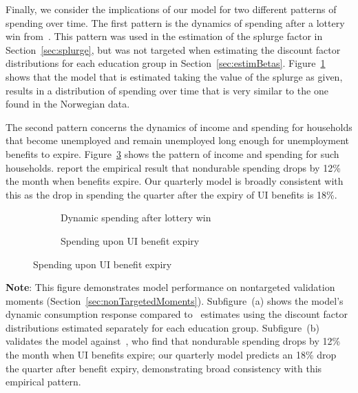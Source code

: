 \documentclass[qe,draft]{econsocart}
\theoremstyle{plain}
\theoremstyle{definition}
\begin{document}
Finally, we consider the implications of our model for two different patterns of spending over time.
The first pattern is the dynamics of spending after a lottery win from~\citeauthor{fagereng-mpc-2021}.
This pattern was used in the estimation of the splurge factor in Section~\ref{sec:splurge}, but was not targeted when estimating the discount factor distributions for each education group in Section~\ref{sec:estimBetas}.
Figure~\ref{fig:USaggmpclotterywin} shows that the model that is estimated taking the value of the splurge as given, results in a distribution of spending over time that is very similar to the one found in the Norwegian data.

\label{ganong-noel}

The second pattern concerns the dynamics of income and spending for households that become unemployed and remain unemployed long enough for unemployment benefits to expire.
Figure~\ref{fig:expiryUI} shows the pattern of income and spending for such households.
\cite{ganongConsumer2019} report the empirical result that nondurable spending drops by 12\% the month when benefits expire.
Our quarterly model is broadly consistent with this as the drop in spending the quarter after the expiry of UI benefits is 18\%.

\begin{figure}[H]
  \centering
  \caption{\pregenmark Model validation for nontargeted spending patterns}
  \label{fig:untargetedMoments} %
  \noindent\begin{minipage}{\textwidth}
    \centering
    \begin{subfigure}[b]{.48\linewidth}
      \centering
      \caption{Dynamic spending after lottery win}
      \label{fig:USaggmpclotterywin} %
    \end{subfigure}
    \begin{subfigure}[b]{.48\linewidth}
      \centering
      \caption{Spending upon UI benefit expiry}
      \label{fig:expiryUI} %
    \end{subfigure}
  \end{minipage}
\end{figure}
\noindent\parbox{\textwidth}{\footnotesize
  \textbf{Note}: This figure demonstrates model performance on nontargeted validation moments (Section~\ref{sec:nonTargetedMoments}).
  Subfigure~(a) shows the model's dynamic consumption response compared to~\cite{fagereng-mpc-2021} estimates
  using the discount factor distributions estimated separately for each education group.
  Subfigure~(b) validates the model against~\cite{ganongConsumer2019}, who find that nondurable spending
  drops by 12\% the month when UI benefits expire; our quarterly model predicts an 18\% drop
  the quarter after benefit expiry,   demonstrating broad consistency with this empirical pattern.
}
\end{document}
